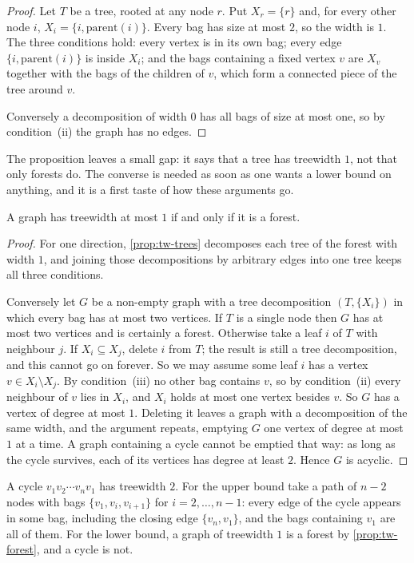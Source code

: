 \begin{proof}
Let $T$ be a tree, rooted at any node $r$. Put $X_r = \{r\}$ and, for every
other node $i$, $X_i = \{i, \mathrm{parent}(i)\}$. Every bag has size at most
$2$, so the width is $1$. The three conditions hold: every vertex is in its own
bag; every edge $\{i,\mathrm{parent}(i)\}$ is inside $X_i$; and the bags
containing a fixed vertex $v$ are $X_v$ together with the bags of the children
of $v$, which form a connected piece of the tree around $v$.

Conversely a decomposition of width $0$ has all bags of size at most one, so by
condition~(ii) the graph has no edges.
\end{proof}

The proposition leaves a small gap: it says that a tree has treewidth $1$, not
that only forests do. The converse is needed as soon as one wants a lower bound
on anything, and it is a first taste of how these arguments go.

\begin{proposition}\label{prop:tw-forest}
A graph has treewidth at most $1$ if and only if it is a forest.
\end{proposition}

\begin{proof}
For one direction, \cref{prop:tw-trees} decomposes each tree of the forest with
width $1$, and joining those decompositions by arbitrary edges into one tree
keeps all three conditions.

Conversely let $G$ be a non-empty graph with a tree decomposition
$(T, \{X_i\})$ in which every bag has at most two vertices. If $T$ is a single
node then $G$ has at most two vertices and is certainly a forest. Otherwise
take a leaf $i$ of $T$ with neighbour $j$. If $X_i \subseteq X_j$, delete $i$
from $T$; the result is still a tree decomposition, and this cannot go on
forever. So we may assume some leaf $i$ has a vertex $v \in X_i \setminus X_j$.
By condition~(iii) no other bag contains $v$, so by condition~(ii) every
neighbour of $v$ lies in $X_i$, and $X_i$ holds at most one vertex besides $v$.
So $G$ has a vertex of degree at most $1$. Deleting it leaves a graph with a
decomposition of the same width, and the argument repeats, emptying $G$ one
vertex of degree at most $1$ at a time. A graph containing a cycle cannot be
emptied that way: as long as the cycle survives, each of its vertices has
degree at least $2$. Hence $G$ is acyclic.
\end{proof}

\begin{example}[Cycles]\label{ex:tw-cycle}
A cycle $v_1 v_2 \cdots v_n v_1$ has treewidth $2$. For the upper bound take a
path of $n-2$ nodes with bags $\{v_1, v_i, v_{i+1}\}$ for $i = 2, \ldots, n-1$:
every edge of the cycle appears in some bag, including the closing edge
$\{v_n,v_1\}$, and the bags containing $v_1$ are all of them. For the lower
bound, a graph of treewidth $1$ is a forest by \cref{prop:tw-forest}, and a
cycle is not.
\end{example}

